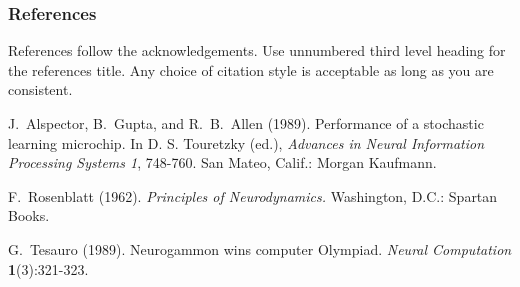 \documentclass[letterpaper]{article}
\begin{document}
\newpage


\subsubsection*{References}

References follow the acknowledgements.  Use unnumbered third level
heading for the references title.  Any choice of citation style is
acceptable as long as you are consistent.


J.~Alspector, B.~Gupta, and R.~B.~Allen  (1989). Performance of a
stochastic learning microchip.  In D. S. Touretzky (ed.), {\it Advances
in Neural Information Processing Systems 1}, 748-760.  San Mateo, Calif.:
Morgan Kaufmann.

F.~Rosenblatt (1962). {\it Principles of Neurodynamics.} Washington,
D.C.: Spartan Books.

G.~Tesauro (1989). Neurogammon wins computer Olympiad.  {\it Neural
Computation} {\bf 1}(3):321-323.
\end{document}
